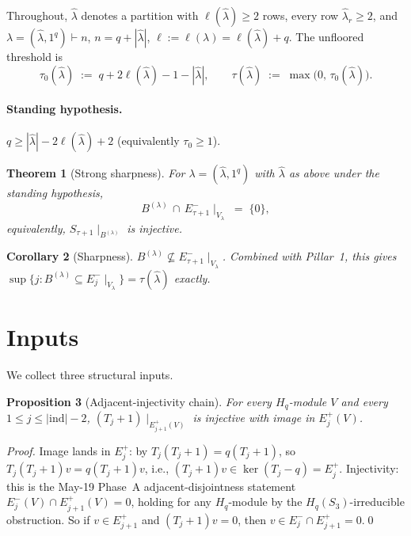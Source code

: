 \documentclass[11pt]{article}
\newtheorem{theorem}{Theorem}
\newtheorem{proposition}[theorem]{Proposition}
\newtheorem{corollary}[theorem]{Corollary}
\theoremstyle{definition}
\newcommand{\Hq}{H_q}
\newcommand{\Vlam}{V_\lambda}
\newcommand{\hatl}{\widehat\lambda}
\newcommand{\elh}{\ell(\hatl)}
\begin{document}
Throughout, $\hatl$ denotes a partition with $\elh \ge 2$ rows, every
row $\hatl_r \ge 2$, and $\lambda = (\hatl, 1^q) \vdash n$, $n = q +
|\hatl|$, $\ell := \ell(\lambda) = \elh + q$. The unfloored threshold
is
\[
   \tau_0(\hatl) \;:=\; q + 2\elh - 1 - |\hatl|,
   \qquad
   \tau(\hatl) \;:=\; \max\bigl(0,\,\tau_0(\hatl)\bigr).
\]

\paragraph{Standing hypothesis.} $q \ge |\hatl| - 2\elh + 2$
(equivalently $\tau_0 \ge 1$).

\begin{theorem}[Strong sharpness]\label{thm:main}
For $\lambda = (\hatl, 1^q)$ with $\hatl$ as above under the standing
hypothesis,
\[
   B^{(\lambda)} \,\cap\, E^-_{\tau+1}\!\mid_{\Vlam} \;=\; \{0\},
\]
equivalently, $S_{\tau+1}\!\mid_{B^{(\lambda)}}$ is injective.
\end{theorem}

\begin{corollary}[Sharpness]\label{cor:sharp}
$B^{(\lambda)} \not\subseteq E^-_{\tau+1}\!\mid_{\Vlam}$. Combined
with Pillar~1, this gives
$\sup\{j : B^{(\lambda)} \subseteq E^-_j\!\mid_{\Vlam}\} = \tau(\hatl)$
exactly.
\end{corollary}

\section{Inputs}\label{sec:inputs}

We collect three structural inputs.

\begin{proposition}[Adjacent-injectivity chain]\label{prop:adj-inj}
For every $\Hq$-module $V$ and every $1 \le j \le |\mathrm{ind}|-2$,
$(T_j+1)\!\mid_{E^+_{j+1}(V)}$ is injective with image in $E^+_j(V)$.
\end{proposition}

\begin{proof}
Image lands in $E^+_j$: by $T_j(T_j+1) = q(T_j+1)$, so
$T_j(T_j+1)v = q(T_j+1)v$, i.e., $(T_j+1)v \in \ker(T_j - q) = E^+_j$.
Injectivity: this is the May-19 Phase~A adjacent-disjointness statement
$E_j^-(V) \cap E_{j+1}^+(V) = 0$, holding for any
$\Hq$-module by the $H_q(S_3)$-irreducible obstruction. So if
$v \in E^+_{j+1}$ and $(T_j+1)v = 0$, then $v \in E^-_j \cap E^+_{j+1}
= 0$.\qed
\end{proof}
\end{document}
